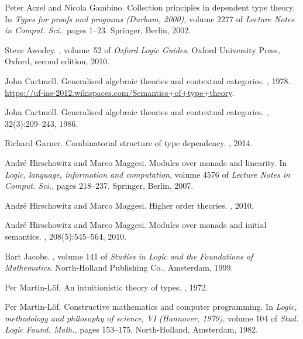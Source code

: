 \documentclass[11pt]{article}
\begin{document}
\def\cprime{$'$}
\begin{thebibliography}{10}

Peter Aczel and Nicola Gambino.
\newblock Collection principles in dependent type theory.
\newblock In {\em Types for proofs and programs ({D}urham, 2000)}, volume 2277
  of {\em Lecture Notes in Comput. Sci.}, pages 1--23. Springer, Berlin, 2002.

Steve Awodey.
, volume~52 of {\em Oxford Logic Guides}.
\newblock Oxford University Press, Oxford, second edition, 2010.

John Cartmell.
\newblock Generalised algebraic theories and contextual categories.
, 1978.
\newblock \url{https://uf-ias-2012.wikispaces.com/Semantics+of+type+theory}.

John Cartmell.
\newblock Generalised algebraic theories and contextual categories.
, 32(3):209--243, 1986.

Richard Garner.
\newblock Combinatorial structure of type dependency.
, 2014.

Andr{\'e} Hirschowitz and Marco Maggesi.
\newblock Modules over monads and linearity.
\newblock In {\em Logic, language, information and computation}, volume 4576 of
  {\em Lecture Notes in Comput. Sci.}, pages 218--237. Springer, Berlin, 2007.

Andr{\'e} Hirschowitz and Marco Maggesi.
\newblock Higher order theories.
, 2010.

Andr{\'e} Hirschowitz and Marco Maggesi.
\newblock Modules over monads and initial semantics.
, 208(5):545--564, 2010.

Bart Jacobs.
, volume 141 of {\em Studies
  in Logic and the Foundations of Mathematics}.
\newblock North-Holland Publishing Co., Amsterdam, 1999.

Per Martin-L{\"o}f.
\newblock An intuitionistic theory of types.
,
  1972.

Per Martin-L{\"o}f.
\newblock Constructive mathematics and computer programming.
\newblock In {\em Logic, methodology and philosophy of science, {VI}
  ({H}annover, 1979)}, volume 104 of {\em Stud. Logic Found. Math.}, pages
  153--175. North-Holland, Amsterdam, 1982.


\end{thebibliography}
\end{document}

